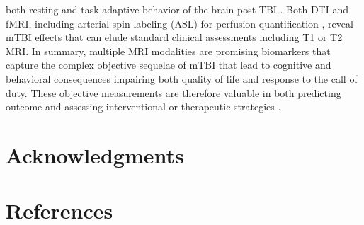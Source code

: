 \documentclass[preprint,1p,times]{elsarticle}
\begin{document}
both resting and task-adaptive behavior of the brain post-TBI
\cite{Roy2010,Mayer2011,Scheibel2012,Stevens2012}.  Both DTI and fMRI,
including arterial spin labeling (ASL) for perfusion quantification
\cite{Ge2009,Grossman2013}, reveal mTBI effects that can elude 
standard clinical assessments including T1 or T2 MRI.
In summary, multiple MRI modalities are promising biomarkers that 
capture the complex objective sequelae of mTBI that lead to cognitive and behavioral consequences
impairing both quality of life and response to the call of duty.
These objective measurements are therefore valuable in both predicting
outcome and assessing interventional or therapeutic strategies \cite{Roy2010,Rigg2011,Niemeier2011}.




\section*{Acknowledgments}

\section*{References}










\end{document}
